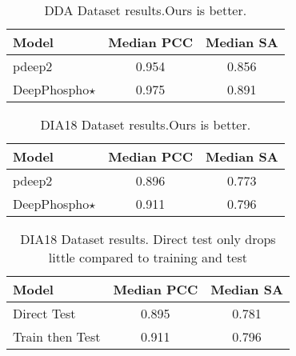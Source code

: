  \begin{table}
    \begin{center}
    \begin{tabular}{|l|c|c|}
    \hline
    Model & Median PCC & Median SA \\
    \hline\hline
    pdeep2 & 0.954 & 0.856 \\
    DeepPhospho$\star$ & 0.975 & 0.891 \\
    \hline
    \end{tabular}
    \end{center}
    \caption{DDA Dataset results.Ours is better.}
    \label{table:DDA}
    \end{table}
 
 \begin{table}
    \begin{center}
    \begin{tabular}{|l|c|c|}
    \hline
    Model & Median PCC & Median SA \\
    \hline\hline
    pdeep2 & 0.896 & 0.773 \\
    DeepPhospho$\star$ & 0.911 & 0.796 \\
    \hline
    \end{tabular}
    \end{center}
    \caption{DIA18 Dataset results.Ours is better.}
    \label{table:DIA18}
 \end{table}
 
 \begin{table}
    \begin{center}
    \begin{tabular}{|l|c|c|}
    \hline
    Model & Median PCC & Median SA \\
    \hline\hline
    Direct Test & 0.895 & 0.781 \\
    Train then Test & 0.911 & 0.796 \\
    \hline
    \end{tabular}
    \end{center}
    \caption{DIA18 Dataset results. Direct test only drops little compared to training and test}
    \label{table:DIA18_direct}
 \end{table}
